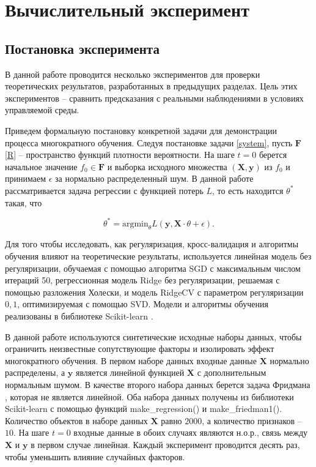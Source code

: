\section{Вычислительный эксперимент} \label{sec:experiments}

\subsection{Постановка эксперимента}

    В данной работе проводится несколько экспериментов для проверки теоретических результатов, разработанных в предыдущих разделах. Цель этих экспериментов -- сравнить предсказания с реальными наблюдениями в условиях управляемой среды.
    
    Приведем формальную постановку конкретной задачи для демонстрации процесса многократного обучения. Следуя постановке задачи \eqref{system}, пусть $\textbf{F}$ \eqref{R} -- пространство функций плотности вероятности. На шаге $t = 0$ берется начальное значение $f_0 \in \textbf{F}$ и выборка исходного множества $(\textbf{X}, \mathbf{y})$ из $f_0$ и принимаем $\epsilon$ за нормально распределенный шум. В данной работе рассматривается задача регрессии с функцией потерь $L$, то есть находится $\theta^*$ такая, что

    \begin{equation*} \label{regression}
        \theta^* = \text{argmin}_{\theta} L (\mathbf{y}, \textbf{X} \cdot \theta + \epsilon).
    \end{equation*}

    Для того чтобы исследовать, как регуляризация, кросс-валидация и алгоритмы обучения влияют на теоретические результаты, используется линейная модель без регуляризации, обучаемая с помощью алгоритма SGD с максимальным числом итераций 50, регрессионная модель Ridge без регуляризации, решаемая с помощью разложения Холески, и модель RidgeCV с параметром регуляризации $0,1$, оптимизируемая с помощью SVD. Модели и алгоритмы обучения реализованы в библиотеке Scikit-learn \citep{pedregosa2011scikit}.

    В данной работе используются синтетические исходные наборы данных, чтобы ограничить неизвестные сопутствующие факторы и изолировать эффект многократного обучения. В первом наборе данных входные данные $\textbf{X}$ нормально распределены, а $\mathbf{y}$ является линейной функцией $\textbf{X}$ с дополнительным нормальным шумом. В качестве второго набора данных берется задача Фридмана \citep{friedman1991multivariate}, которая не является линейной.
    Оба набора данных получены из библиотеки Scikit-learn \citep{pedregosa2011scikit} с помощью функций make\_regression() и make\_friedman1().
    Количество объектов в наборе данных $\textbf{X}$ равно $2000$, а количество признаков -- $10$.
    На шаге $t=0$ входные данные в обоих случаях являются н.о.р., связь между $\textbf{X}$ и $\mathbf{y}$ в первом случае линейная. Каждый эксперимент проводится десять раз, чтобы уменьшить влияние случайных факторов. 
    
